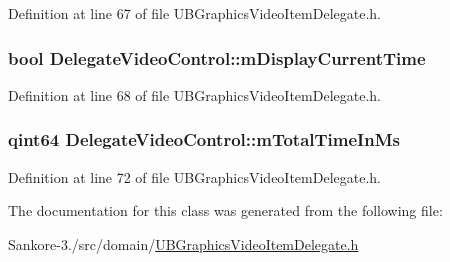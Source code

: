Definition at line 67 of file U\-B\-Graphics\-Video\-Item\-Delegate.\-h.

\hypertarget{class_delegate_video_control_a203df9a0783f9b13b2dbeb3bd36e17c3}{
\subsubsection[{m\-Display\-Current\-Time}]{\setlength{\rightskip}{0pt plus 5cm}bool Delegate\-Video\-Control\-::m\-Display\-Current\-Time\hspace{0.3cm}{\ttfamily [protected]}}}\label{d6/dfb/class_delegate_video_control_a203df9a0783f9b13b2dbeb3bd36e17c3}


Definition at line 68 of file U\-B\-Graphics\-Video\-Item\-Delegate.\-h.

\hypertarget{class_delegate_video_control_aade232616040470361ef28f72e782f67}{
\subsubsection[{m\-Total\-Time\-In\-Ms}]{\setlength{\rightskip}{0pt plus 5cm}qint64 Delegate\-Video\-Control\-::m\-Total\-Time\-In\-Ms\hspace{0.3cm}{\ttfamily [protected]}}}\label{d6/dfb/class_delegate_video_control_aade232616040470361ef28f72e782f67}


Definition at line 72 of file U\-B\-Graphics\-Video\-Item\-Delegate.\-h.



The documentation for this class was generated from the following file\-:\begin{DoxyCompactItemize}
\item 
Sankore-\/3./src/domain/\hyperlink{_u_b_graphics_video_item_delegate_8h}{U\-B\-Graphics\-Video\-Item\-Delegate.\-h}\end{DoxyCompactItemize}
